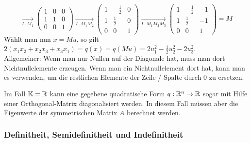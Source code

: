 \begin{bsp}
\begin{equation*}
		\xrightarrow[I \cdot M_1]{}
		\begin{pmatrix}
			1 & 0 & 0 \\
			1 & 1 & 0 \\
			0 & 0 & 1
		\end{pmatrix}
		\xrightarrow[I \cdot M_1M_2]{}
		\begin{pmatrix}
			1 & -\frac{1}{2} & 0 \\
			1 & \frac{1}{2} & 0 \\
			0 & 0 & 1
		\end{pmatrix}
		\xrightarrow[I \cdot M_1M_2M_3]{}
		\begin{pmatrix}
			1 & -\frac{1}{2} & -1 \\
			1 & \frac{1}{2} & -1 \\
			0 & 0 & 1
		\end{pmatrix} = M
	\end{equation*}
	Wählt man nun $ x = Mu $, so gilt $ 2(x_1x_2 + x_2x_3 + x_3x_1) = q(x) = q(Mu) = 2u_1^2 - \frac{1}{2}u_2^2 - 2u_3^2 $. \\[10pt]
	Allgemeiner: Wenn man nur Nullen auf der Diagonale hat, muss man dort Nichtnullelemente erzeugen. Wenn man ein Nichtnullelement dort hat, kann man es verwenden, um die restlichen Elemente der Zeile / Spalte durch 0 zu ersetzen.
\end{bsp}
\begin{bem}
	Im Fall $ \mathbb K = \mathbb R $ kann eine gegebene quadratische Form $ q : \mathbb R^n \to \mathbb R $ sogar mit Hilfe einer Orthogonal-Matrix diagonalisiert werden. In diesem Fall müssen aber die Eigenwerte der symmetrischen Matrix $ A $ berechnet werden.
\end{bem}

\subsubsection{Definitheit, Semidefinitheit und Indefinitheit}

